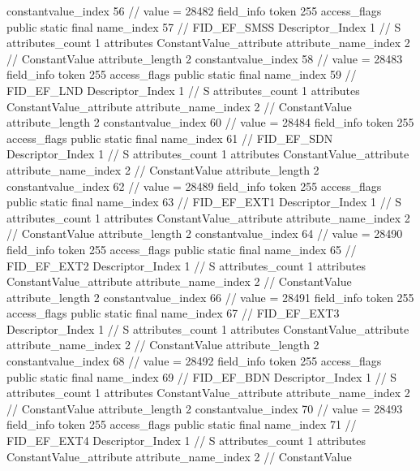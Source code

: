 {{{{{{{					constantvalue_index	56		// value = 28482
				}
				}
			}
			field_info {
				token	255
				access_flags	public static final
				name_index	57		// FID_EF_SMSS
				Descriptor_Index	1		// S
				attributes_count	1
				attributes {
				ConstantValue_attribute {
					attribute_name_index	2		// ConstantValue
					attribute_length	2
					constantvalue_index	58		// value = 28483
				}
				}
			}
			field_info {
				token	255
				access_flags	public static final
				name_index	59		// FID_EF_LND
				Descriptor_Index	1		// S
				attributes_count	1
				attributes {
				ConstantValue_attribute {
					attribute_name_index	2		// ConstantValue
					attribute_length	2
					constantvalue_index	60		// value = 28484
				}
				}
			}
			field_info {
				token	255
				access_flags	public static final
				name_index	61		// FID_EF_SDN
				Descriptor_Index	1		// S
				attributes_count	1
				attributes {
				ConstantValue_attribute {
					attribute_name_index	2		// ConstantValue
					attribute_length	2
					constantvalue_index	62		// value = 28489
				}
				}
			}
			field_info {
				token	255
				access_flags	public static final
				name_index	63		// FID_EF_EXT1
				Descriptor_Index	1		// S
				attributes_count	1
				attributes {
				ConstantValue_attribute {
					attribute_name_index	2		// ConstantValue
					attribute_length	2
					constantvalue_index	64		// value = 28490
				}
				}
			}
			field_info {
				token	255
				access_flags	public static final
				name_index	65		// FID_EF_EXT2
				Descriptor_Index	1		// S
				attributes_count	1
				attributes {
				ConstantValue_attribute {
					attribute_name_index	2		// ConstantValue
					attribute_length	2
					constantvalue_index	66		// value = 28491
				}
				}
			}
			field_info {
				token	255
				access_flags	public static final
				name_index	67		// FID_EF_EXT3
				Descriptor_Index	1		// S
				attributes_count	1
				attributes {
				ConstantValue_attribute {
					attribute_name_index	2		// ConstantValue
					attribute_length	2
					constantvalue_index	68		// value = 28492
				}
				}
			}
			field_info {
				token	255
				access_flags	public static final
				name_index	69		// FID_EF_BDN
				Descriptor_Index	1		// S
				attributes_count	1
				attributes {
				ConstantValue_attribute {
					attribute_name_index	2		// ConstantValue
					attribute_length	2
					constantvalue_index	70		// value = 28493
				}
				}
			}
			field_info {
				token	255
				access_flags	public static final
				name_index	71		// FID_EF_EXT4
				Descriptor_Index	1		// S
				attributes_count	1
				attributes {
				ConstantValue_attribute {
					attribute_name_index	2		// ConstantValue
}}}}}}}
